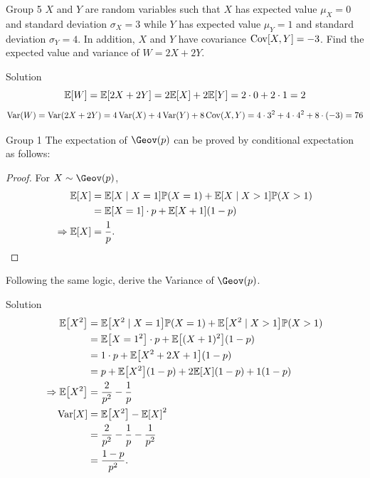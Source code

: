 \documentclass{article}
\begin{document}
\begin{problem}
    {Group 5}
    $X$ and $Y$ are random variables such that $X$ has expected value $\mu_X = 0$ and standard deviation $\sigma_X = 3$ while $Y$ has expected value $\mu_Y = 1$ and standard deviation $\sigma_Y = 4$. In addition, $X$ and $Y$ have covariance $\mathop{\mathrm{Cov}}\nolimits[X, Y] = -3$. Find the expected value and variance of $W = 2X+2Y$.
\end{problem}

\begin{solution}
    {Solution}
    \[
        \E{W} = \E{2X+2Y} = 2\E{X}+2\E{Y} = 2\cdot 0+2\cdot 1 = 2
    \]
    \[
        \mathop{\mathrm{Var}}\nolimits(W) = \mathop{\mathrm{Var}}\nolimits(2X+2Y) = 4\mathop{\mathrm{Var}}\nolimits(X)+4\mathop{\mathrm{Var}}\nolimits(Y)+8\mathop{\mathrm{Cov}}\nolimits(X,Y) = 4\cdot 3^2+4\cdot 4^2+8\cdot (-3) = 76
    \]
\end{solution}
\begin{problem}
    {Group 1}
    The expectation of $\Geov(p)$ can be proved by conditional expectation as follows:
    \begin{proof}
        For $X\sim\Geov(p)$,
        \begin{align*}
            \E{X}
            &= \condE{X}{X=1}\P{X=1}+\condE{X}{X>1}\P{X>1}\\
            &= \E{X=1}\cdot p + \E{X+1}(1-p)\\
            \Rightarrow
            \E{X} &= \frac{1}{p}.
        \end{align*}
    \end{proof}
    Following the same logic, derive the Variance of $\Geov(p)$.
\end{problem}

\begin{solution}
    {Solution}
    \begin{align*}
        \E{X^2}
        &= \condE{X^2}{X=1}\P{X=1}+\condE{X^2}{X>1}\P{X>1}\\
        &= \E{X=1^2}\cdot p + \E{(X+1)^2}(1-p)\\
        &= 1\cdot p + \E{X^2+2X+1}(1-p)\\
        &= p + \E{X^2}(1-p)+2\E{X}(1-p)+1(1-p)\\
        \Rightarrow
        \E{X^2}
        &= \frac{2}{p^2}-\frac{1}{p}\\
        \Var[X]
        &= \E{X^2}-\E{X}^2 \\
        &= \frac{2}{p^2}-\frac{1}{p}-\frac{1}{p^2} \\
        &= \frac{1-p}{p^2}.
    \end{align*}
\end{solution}
\end{document}
